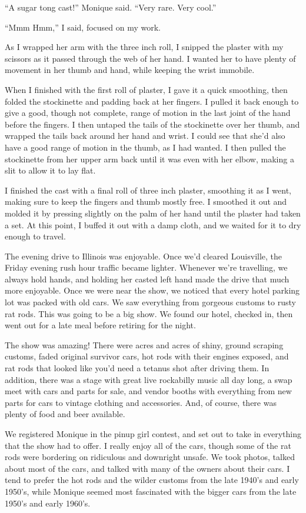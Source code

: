 ``A sugar tong cast!'' Monique said. ``Very rare. Very cool.''

``Mmm Hmm,'' I said, focused on my work.

As I wrapped her arm with the three inch roll, I snipped the plaster with my scissors as it
passed through the web of her hand. I wanted her to have plenty of movement in her thumb and
hand, while keeping the wrist immobile.

When I finished with the first roll of plaster, I gave it a quick smoothing, then folded the
stockinette and padding back at her fingers. I pulled it back enough to give a good, though not
complete, range of motion in the last joint of the hand before the fingers. I then untaped the
tails of the stockinette over her thumb, and wrapped the tails back around her hand and wrist. I
could see that she'd also have a good range of motion in the thumb, as I had wanted. I then
pulled the stockinette from her upper arm back until it was even with her elbow, making a slit
to allow it to lay flat.

I finished the cast with a final roll of three inch plaster, smoothing it as I went, making
sure to keep the fingers and thumb mostly free. I smoothed it out and molded it by pressing
slightly on the palm of her hand until the plaster had taken a set. At this point, I buffed it
out with a damp cloth, and we waited for it to dry enough to travel.

The evening drive to Illinois was enjoyable. Once we'd cleared Louisville, the Friday evening
rush hour traffic became lighter. Whenever we're travelling, we always hold hands, and holding
her casted left hand made the drive that much more enjoyable. Once we were near the show, we
noticed that every hotel parking lot was packed with old cars. We saw everything from gorgeous
customs to rusty rat rods. This was going to be a big show. We found our hotel, checked in, then
went out for a late meal before retiring for the night.

The show was amazing! There were acres and acres of shiny, ground scraping customs, faded
original survivor cars, hot rods with their engines exposed, and rat rods that looked like you'd
need a tetanus shot after driving them. In addition, there was a stage with great live
rockabilly music all day long, a swap meet with cars and parts for sale, and vendor booths with
everything from new parts for cars to vintage clothing and accessories. And, of course, there
was plenty of food and beer available.

We registered Monique in the pinup girl contest, and set out to take in everything that the
show had to offer. I really enjoy all of the cars, though some of the rat rods were bordering on
ridiculous and downright unsafe. We took photos, talked about most of the cars, and talked with
many of the owners about their cars. I tend to prefer the hot rods and the wilder customs from
the late 1940's and early 1950's, while Monique seemed most fascinated with the bigger cars from
the late 1950's and early 1960's.

